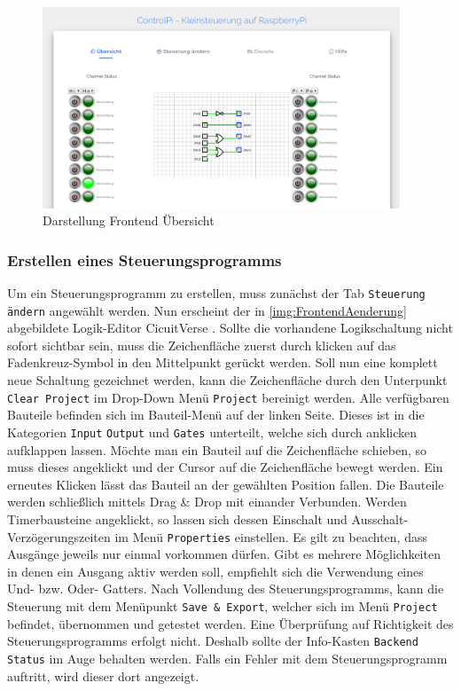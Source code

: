  \begin{figure}[H]
	\begin{center}
		\includegraphics[width=0.95\textwidth]{./images/FrontendUebersicht.png}
		\caption{Darstellung Frontend Übersicht}
		\label{img:FrontendUebersicht}
	\end{center} 
\end{figure}

\subsubsection{Erstellen eines Steuerungsprogramms}

Um ein Steuerungsprogramm zu erstellen, muss zunächst der Tab \texttt{Steuerung ändern} angewählt werden. Nun erscheint der in \autoref{img:FrontendAenderung} abgebildete Logik-Editor CicuitVerse \cite{URL:CircuitVerse}. Sollte die vorhandene Logikschaltung nicht sofort sichtbar sein, muss die Zeichenfläche zuerst durch klicken auf das Fadenkreuz-Symbol in den Mittelpunkt gerückt werden. Soll nun eine komplett neue Schaltung gezeichnet werden, kann die Zeichenfläche durch den Unterpunkt \texttt{Clear Project} im Drop-Down Menü \texttt{Project} bereinigt werden. Alle verfügbaren Bauteile befinden sich im Bauteil-Menü auf der linken Seite. Dieses ist in die Kategorien \texttt{Input} \texttt{Output} und \texttt{Gates} unterteilt, welche sich durch anklicken aufklappen lassen. Möchte man ein Bauteil auf die Zeichenfläche schieben, so muss dieses angeklickt und der Cursor auf die Zeichenfläche bewegt werden. Ein erneutes Klicken lässt das Bauteil an der gewählten Position fallen. Die Bauteile werden schließlich mittels Drag \& Drop mit einander Verbunden. Werden Timerbausteine angeklickt, so  lassen  sich dessen Einschalt und Ausschalt- Verzögerungszeiten im Menü \texttt{Properties} einstellen. Es gilt zu beachten, dass Ausgänge jeweils nur einmal vorkommen dürfen. Gibt es mehrere Möglichkeiten in denen ein Ausgang aktiv werden soll, empfiehlt sich die Verwendung eines Und- bzw. Oder- Gatters. Nach Vollendung des Steuerungsprogramms, kann die Steuerung mit dem Menüpunkt \texttt{Save \& Export}, welcher sich im Menü \texttt{Project} befindet, übernommen und getestet werden. Eine Überprüfung auf Richtigkeit des Steuerungsprogramms erfolgt nicht. Deshalb sollte der Info-Kasten \texttt{Backend Status} im Auge behalten werden. Falls ein Fehler mit dem Steuerungsprogramm auftritt, wird dieser dort angezeigt. 
	

